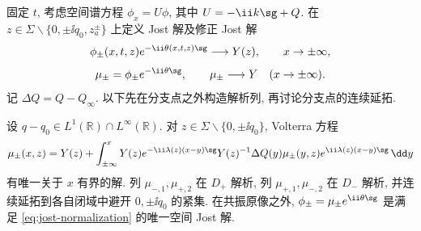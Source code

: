 固定 $t$, 考虑空间谱方程 $\phi_x=U\phi$, 其中 $U=-\ii k\sg+Q$. 在 $z\in\Sigma\mathbin{\backslash}\{0,\pm\ii q_0,z_a^\pm\}$ 上定义 Jost 解及修正 Jost 解
\begin{equation}\label{eq:jost-normalization}
\phi_\pm(x,t,z)e^{-\ii\theta(x,t,z)\sg}\longrightarrow Y(z),\qquad x\to\pm\infty,
\end{equation}
\begin{equation}\label{eq:modified-jost}
\mu_\pm=\phi_\pm e^{-\ii\theta\sg},\qquad \mu_\pm\longrightarrow Y\quad(x\to\pm\infty).
\end{equation}
记 $\Delta Q=Q-Q_\infty$. 以下先在分支点之外构造解析列, 再讨论分支点的连续延拓.

\begin{theorem}\label{thm:jost}
设 $q-q_0\in L^1(\mathbb R)\cap L^\infty(\mathbb R)$. 对 $z\in\Sigma\mathbin{\backslash}\{0,\pm\ii q_0\}$, Volterra 方程
\begin{equation}\label{eq:volterra}
\mu_\pm(x,z)=Y(z)+\int_{\pm\infty}^{x}
Y(z)e^{-\ii\lambda(z)(x-y)\sg}Y(z)^{-1}
\Delta Q(y)\mu_\pm(y,z)e^{\ii\lambda(z)(x-y)\sg}\,\dd y
\end{equation}
有唯一关于 $x$ 有界的解. 列 $\mu_{-,1},\mu_{+,2}$ 在 $D_+$ 解析, 列 $\mu_{+,1},\mu_{-,2}$ 在 $D_-$ 解析, 并连续延拓到各自闭域中避开 $0,\pm\ii q_0$ 的紧集. 在共振原像之外, $\phi_\pm=\mu_\pm e^{\ii\theta\sg}$ 是满足 \eqref{eq:jost-normalization} 的唯一空间 Jost 解.
\end{theorem}
